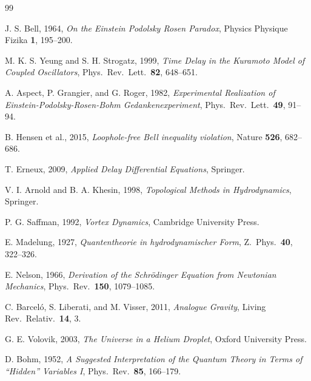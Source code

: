 \documentclass[11pt]{article}
\begin{document}
\begin{thebibliography}{99}

J. S. Bell, 1964, \textit{On the Einstein Podolsky Rosen Paradox}, Physics Physique Fizika \textbf{1}, 195--200.

M. K. S. Yeung and S. H. Strogatz, 1999, \textit{Time Delay in the Kuramoto Model of Coupled Oscillators}, Phys.\ Rev.\ Lett.\ \textbf{82}, 648--651.

A. Aspect, P. Grangier, and G. Roger, 1982, \textit{Experimental Realization of Einstein-Podolsky-Rosen-Bohm Gedankenexperiment}, Phys.\ Rev.\ Lett.\ \textbf{49}, 91--94.

B. Hensen et al., 2015, \textit{Loophole-free Bell inequality violation}, Nature \textbf{526}, 682--686.

T. Erneux, 2009, \textit{Applied Delay Differential Equations}, Springer.

V. I. Arnold and B. A. Khesin, 1998, \textit{Topological Methods in Hydrodynamics}, Springer.

P. G. Saffman, 1992, \textit{Vortex Dynamics}, Cambridge University Press.

E. Madelung, 1927, \textit{Quantentheorie in hydrodynamischer Form}, Z.\ Phys.\ \textbf{40}, 322--326.

E. Nelson, 1966, \textit{Derivation of the Schr\"odinger Equation from Newtonian Mechanics}, Phys.\ Rev.\ \textbf{150}, 1079--1085.

C. Barcel\'o, S. Liberati, and M. Visser, 2011, \textit{Analogue Gravity}, Living Rev.\ Relativ.\ \textbf{14}, 3.

G. E. Volovik, 2003, \textit{The Universe in a Helium Droplet}, Oxford University Press.

D. Bohm, 1952, \textit{A Suggested Interpretation of the Quantum Theory in Terms of ``Hidden'' Variables I}, Phys.\ Rev.\ \textbf{85}, 166--179.

\end{thebibliography}
\end{document}
